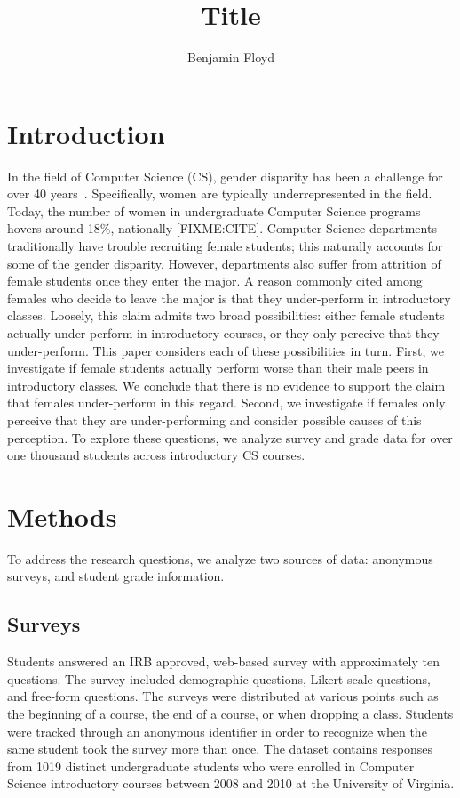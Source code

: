\documentclass[a4paper,man,natbib]{apa6}
\title{Title}
\author{Benjamin Floyd}
\affiliation{University of Virginia}
\begin{document}
\maketitle

\section{Introduction}
\label{sec:intro}

In the field of Computer Science (CS), gender disparity has been a challenge
for over 40 years~\citep{FIXME}. Specifically, women are typically
underrepresented in the field. Today, the number of women in undergraduate
Computer Science programs hovers around 18\%, nationally [FIXME:CITE]. Computer
Science departments traditionally have trouble recruiting female students; this
naturally accounts for some of the gender disparity. However, departments also
suffer from attrition of female students once they enter the major. A reason
commonly cited among females who decide to leave the major is that they
under-perform in introductory classes. Loosely, this claim admits two broad
possibilities: either female students actually under-perform in introductory
courses, or they only perceive that they under-perform. This paper considers
each of these possibilities in turn. First, we investigate if female students
actually perform worse than their male peers in introductory classes. We
conclude that there is no evidence to support the claim that females
under-perform in this regard. Second, we investigate if females only perceive
that they are under-performing and consider possible causes of this perception.
To explore these questions, we analyze survey and grade data for over one
thousand students across introductory CS courses.

\section{Methods}
\label{sec:methods}
To address the research questions, we analyze two sources of data: anonymous
surveys, and student grade information. 

\subsection{Surveys}
\label{sec:survey}
Students answered an IRB approved, web-based survey with approximately ten
questions. The survey included demographic questions, Likert-scale questions,
and free-form questions. The surveys were distributed at various points such as the
beginning of a course, the end of a course, or when dropping a class. Students
were tracked through an anonymous identifier in order to recognize when the
same student took the survey more than once. The dataset contains responses
from 1019 distinct undergraduate students who were enrolled in Computer Science
introductory courses between 2008 and 2010 at the University of Virginia.
\end{document}
